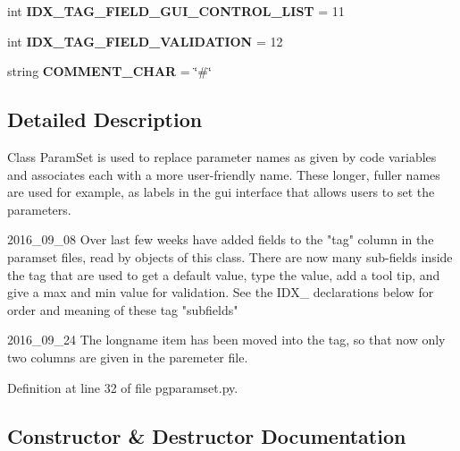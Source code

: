 \begin{DoxyCompactItemize}
\item 
int {\bfseries I\+D\+X\+\_\+\+T\+A\+G\+\_\+\+F\+I\+E\+L\+D\+\_\+\+G\+U\+I\+\_\+\+C\+O\+N\+T\+R\+O\+L\+\_\+\+L\+I\+ST} = 11\hypertarget{classnegui_1_1pgparamset_1_1PGParamSet_aee6b6d1c25ba78020df4ee6c4db6b4da}{}\label{classnegui_1_1pgparamset_1_1PGParamSet_aee6b6d1c25ba78020df4ee6c4db6b4da}

\item 
int {\bfseries I\+D\+X\+\_\+\+T\+A\+G\+\_\+\+F\+I\+E\+L\+D\+\_\+\+V\+A\+L\+I\+D\+A\+T\+I\+ON} = 12\hypertarget{classnegui_1_1pgparamset_1_1PGParamSet_a859b19d511c2d6b5b912f9fabe172b10}{}\label{classnegui_1_1pgparamset_1_1PGParamSet_a859b19d511c2d6b5b912f9fabe172b10}

\item 
string {\bfseries C\+O\+M\+M\+E\+N\+T\+\_\+\+C\+H\+AR} = \char`\"{}\#\char`\"{}\hypertarget{classnegui_1_1pgparamset_1_1PGParamSet_a3699c7f57795876fe0a6d4482bfd3295}{}\label{classnegui_1_1pgparamset_1_1PGParamSet_a3699c7f57795876fe0a6d4482bfd3295}

\end{DoxyCompactItemize}


\subsection{Detailed Description}
\begin{DoxyVerb}Class ParamSet is used to replace
parameter names as given by code variables
and associates each with a more user-friendly
name.  These longer, fuller names are used
for example, as labels in the gui interface
that allows users to set the parameters.

2016_09_08
Over last few weeks have added fields to the "tag"
column in the paramset files, read by objects of
this class.  There are now many sub-fields inside
the tag that are used to get a default value, 
type the value, add a tool tip, and give a max
and min value for validation.  See the IDX_ declarations
below for order and meaning of these tag "subfields"

2016_09_24
The longname item has been moved into the tag, so that now
only two columns are given in the paremeter file.\end{DoxyVerb}
 

Definition at line 32 of file pgparamset.\+py.



\subsection{Constructor \& Destructor Documentation}
